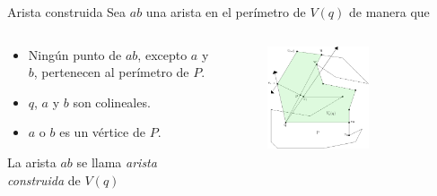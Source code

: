 \documentclass[aspectratio=169,xcolor=dvipsnames, t]{beamer}
\begin{document}
\begin{frame}{Arista construida}
  Sea $ab$ una arista en el perímetro de $V(q)$ de manera que
  \begin{columns}
    \begin{column}{0.45\textwidth}
      \begin{itemize}
      \item Ningún punto de $ab$, excepto $a$ y $b$, pertenecen al perímetro de $P$.
      \item $q$, $a$ y $b$ son colineales.
      \item $a$ o $b$ es un vértice de $P$.
      \end{itemize}
      \vspace{0.5cm}
      \begin{center}
        La arista $ab$ se llama \textit{arista construida} de $V(q)$
      \end{center}
    \end{column}
    \begin{column}{0.45\textwidth}  %
      \vspace{-1cm}
      \begin{figure}
        \centering
        \includegraphics[width=0.65\textwidth]{imagenes/Caso2.7a.png}
      \end{figure}
    \end{column}
  \end{columns}
\end{frame}

\end{document}
